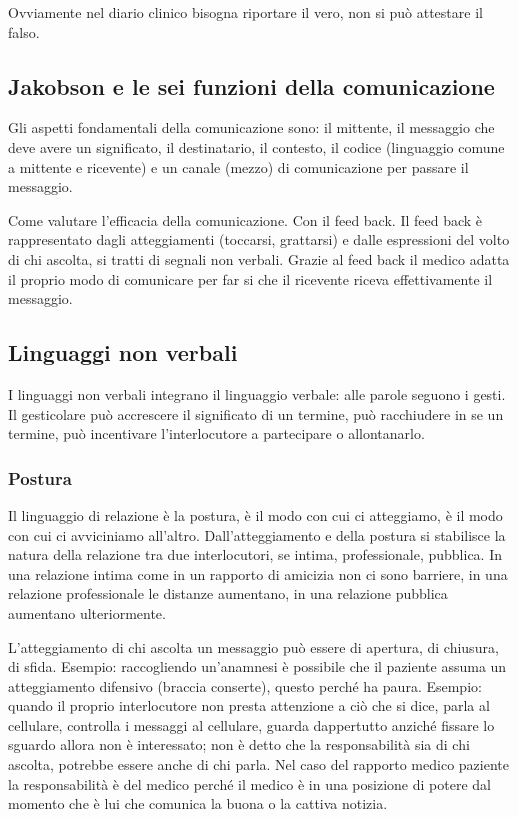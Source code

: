Ovviamente nel diario clinico bisogna riportare il vero, non si può
attestare il falso.

\subsection{Jakobson e le sei funzioni della comunicazione}

Gli aspetti fondamentali della comunicazione sono: il mittente, il
messaggio che deve avere un significato, il destinatario, il contesto,
il codice (linguaggio comune a mittente e ricevente) e un canale (mezzo)
di comunicazione per passare il messaggio.

Come valutare l'efficacia della comunicazione. Con il feed back. Il feed
back è rappresentato dagli atteggiamenti (toccarsi, grattarsi) e dalle
espressioni del volto di chi ascolta, si tratti di segnali non verbali.
Grazie al feed back il medico adatta il proprio modo di comunicare per
far si che il ricevente riceva effettivamente il messaggio.

\subsection{Linguaggi non verbali}

I linguaggi non verbali integrano il linguaggio verbale: alle parole
seguono i gesti. Il gesticolare può accrescere il significato di un
termine, può racchiudere in se un termine, può incentivare
l'interlocutore a partecipare o allontanarlo.

\subsubsection{Postura} 

Il linguaggio di relazione è la postura, è il modo con cui ci
atteggiamo, è il modo con cui ci avviciniamo all'altro.
Dall'atteggiamento e della postura si stabilisce la natura della
relazione tra due interlocutori, se intima, professionale, pubblica. In
una relazione intima come in un rapporto di amicizia non ci sono
barriere, in una relazione professionale le distanze aumentano, in una
relazione pubblica aumentano ulteriormente.

L'atteggiamento di chi ascolta un messaggio può essere di apertura, di
chiusura, di sfida. Esempio: raccogliendo un'anamnesi è possibile che il
paziente assuma un atteggiamento difensivo (braccia conserte), questo
perché ha paura. Esempio: quando il proprio interlocutore non presta
attenzione a ciò che si dice, parla al cellulare, controlla i messaggi
al cellulare, guarda dappertutto anziché fissare lo sguardo allora non è
interessato; non è detto che la responsabilità sia di chi ascolta,
potrebbe essere anche di chi parla. Nel caso del rapporto medico
paziente la responsabilità è del medico perché il medico è in una
posizione di potere dal momento che è lui che comunica la buona o la
cattiva notizia.

